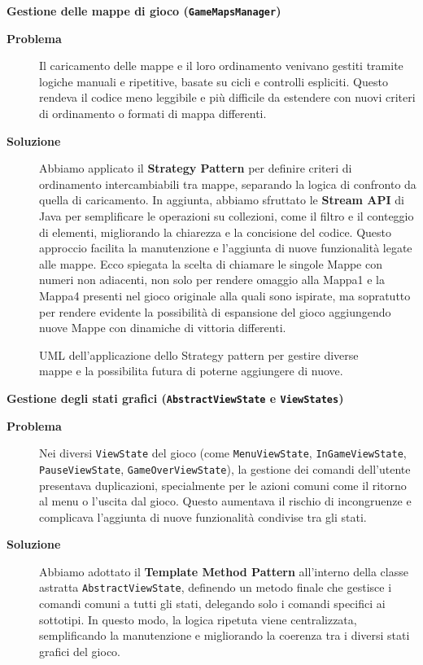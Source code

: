 \documentclass[a4paper,12pt]{report}
\begin{document}
\newpage
\noindent
\textbf{Gestione delle mappe di gioco (\texttt{GameMapsManager})}
\begin{description}
	\item[\textbf{Problema}]
	      Il caricamento delle mappe e il loro ordinamento venivano gestiti tramite logiche manuali e ripetitive, basate su cicli e controlli espliciti. Questo rendeva il codice meno
	      leggibile e più difficile da estendere con nuovi criteri di ordinamento o formati di mappa differenti.

	\item[\textbf{Soluzione}]
	      Abbiamo applicato il \textbf{Strategy Pattern} per definire criteri di ordinamento intercambiabili tra mappe, separando la logica di confronto da quella di caricamento. In
	      aggiunta, abbiamo sfruttato le \textbf{Stream API} di Java per semplificare le operazioni su collezioni, come il filtro e il conteggio di elementi, migliorando la chiarezza e
	      la concisione del codice. Questo approccio facilita la manutenzione e l'aggiunta di nuove funzionalità legate alle mappe. Ecco spiegata la scelta di chiamare le singole Mappe con numeri non adiacenti, 
		  non solo per rendere omaggio alla Mappa1 e la Mappa4 presenti nel gioco originale alla quali sono ispirate, ma sopratutto per rendere evidente la possibilità di espansione del gioco aggiungendo nuove Mappe con dinamiche 
		  di vittoria differenti.
\end{description}
\begin{figure}[H]
	\centering{}
	
	\caption{UML dell'applicazione dello Strategy pattern per gestire diverse mappe e la possibilita futura di poterne aggiungere di nuove.}
	\label{img:GameMapsManager}
\end{figure}
\newpage
\noindent
\textbf{Gestione degli stati grafici (\texttt{AbstractViewState} e \texttt{ViewStates})}
\begin{description}
	\item[\textbf{Problema}]
	      Nei diversi \texttt{ViewState} del gioco (come \texttt{MenuViewState}, \newline \texttt{InGameViewState}, \texttt{PauseViewState}, \texttt{GameOverViewState}), la gestione dei
	      comandi dell'utente presentava duplicazioni, specialmente per le azioni comuni come il ritorno al menu o l'uscita dal gioco. Questo aumentava il rischio di incongruenze e
	      complicava l'aggiunta di nuove funzionalità condivise tra gli stati.

	\item[\textbf{Soluzione}]
	      Abbiamo adottato il \textbf{Template Method Pattern} all'interno della classe astratta \texttt{AbstractViewState}, definendo un metodo finale che gestisce i comandi comuni a tutti
	      gli stati,
	      delegando solo i comandi specifici ai sottotipi. In questo modo, la logica ripetuta viene centralizzata, semplificando la manutenzione e migliorando la coerenza tra i diversi
	      stati grafici del gioco.
\end{description}
\end{document}
